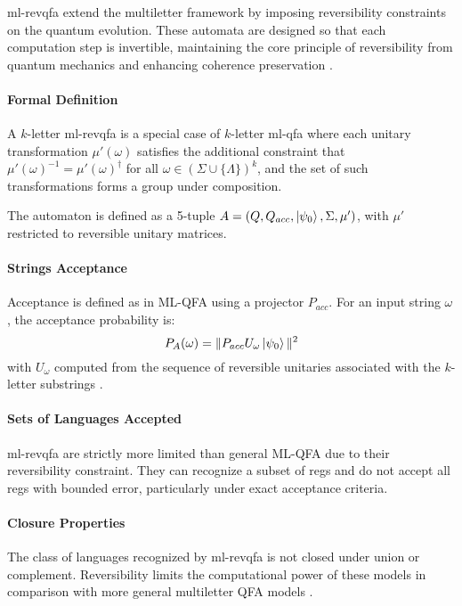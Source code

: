 \subsubsection{}
\gls{ml-revqfa} extend the multiletter framework by imposing reversibility constraints on the quantum evolution. These automata are designed so that each computation step is invertible, maintaining the core principle of reversibility from quantum mechanics and enhancing coherence preservation \cite{belovs2007multi}.

\paragraph{Formal Definition}
A $k$-letter \gls{ml-revqfa} is a special case of $k$-letter \gls{ml-qfa} where each unitary transformation $\mu'(\omega)$ satisfies the additional constraint that $\mu'(\omega)^{-1} = \mu'(\omega)^\dagger$ for all $\omega \in (\Sigma \cup \{\Lambda\})^k$, and the set of such transformations forms a group under composition.

The automaton is defined as a 5-tuple $A = (Q, Q_{acc}, \ket{\psi_0}, \Sigma, \mu')$, with $\mu'$ restricted to reversible unitary matrices.

\paragraph{Strings Acceptance}
Acceptance is defined as in ML-QFA using a projector $P_{acc}$. For an input string $\omega$, the acceptance probability is:
\[
P_A(\omega) = \| P_{acc} U_{\omega} \ket{\psi_0} \|^2
\]
with $U_{\omega}$ computed from the sequence of reversible unitaries associated with the $k$-letter substrings \cite{belovs2007multi}.

\paragraph{Sets of Languages Accepted}
\gls{ml-revqfa} are strictly more limited than general ML-QFA due to their reversibility constraint. They can recognize a subset of \glspl{reg} and do not accept all \glspl{reg} with bounded error, particularly under exact acceptance criteria.

\paragraph{Closure Properties}
The class of languages recognized by \gls{ml-revqfa} is not closed under union or complement. Reversibility limits the computational power of these models in comparison with more general multiletter QFA models \cite{belovs2007multi}.

